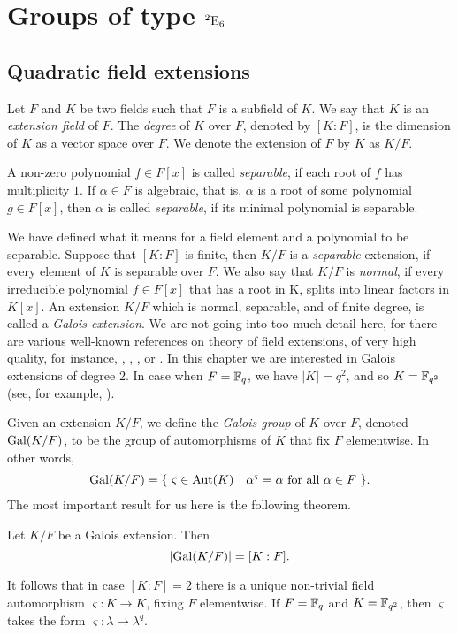 \chapter{Groups of type ${}^2\mathord{\mathrm{E}}_6$}
\ifpdf
    \graphicspath{{Chapter3/Chapter3Figs/PNG/}{Chapter3/Chapter3Figs/PDF/}{Chapter3/Chapter3Figs/}}
\else
    \graphicspath{{Chapter3/Chapter3Figs/EPS/}{Chapter3/Chapter3Figs/}}
\fi

\section{Quadratic field extensions}

Let $F$ and $K$ be two fields such that $F$ is a subfield of $K$. We say that 
$K$ is an \textit{extension field} of $F$. The \textit{degree} of $K$ over $F$, 
denoted by $[K:F]$, is the dimension of $K$ as a vector space over $F$. We denote the
extension of $F$ by $K$ as $K / F$.

A non-zero polynomial $f \in F[x]$ is called \textit{separable}, if each root of $f$ has 
multiplicity $1$. If $\alpha \in F$ is algebraic, that is, $\alpha$ is a root of some polynomial
$g \in F[x]$, then $\alpha$ is called \textit{separable}, if its minimal polynomial is separable. 

We have defined what it means for a field element and a polynomial to be separable. Suppose that
$[K:F]$ is finite, then $K / F$ is a \textit{separable} extension, if every element of $K$ is 
separable over $F$. We also say that $K / F$ is \textit{normal}, if every irreducible 
polynomial $f \in F[x]$ that has a root in K, splits into linear factors in $K[x]$. An extension
$K / F$ which is normal, separable, and of finite degree, is called a \textit{Galois extension}.
We are not going into too much detail here, for there are various  well-known references on theory
of field extensions, of very high quality, for instance, \cite{PeterCameron}, \cite{DummitFoote}, \cite{Lang}, or \cite{Stewart}. In this chapter
we are interested in Galois extensions of degree $2$. 
In case when $F = \mathbb{F}_q$, we have $|K| = q^2$, and so $K = \mathbb{F}_{q^2}$ (see, for example, \cite{Moore}).

Given an extension $K / F$, we define the \textit{Galois group} of $K$ over $F$, denoted
$\mathrm{Gal}(K / F)$, to be the group
of automorphisms of $K$ that fix $F$ elementwise. In other words,
\begin{equation}
	\Gal(K / F) = \{\ \varsigma \in \Aut(K)\ \big|\ \alpha^{\varsigma} = \alpha\ \mbox{for all}\ 
		\alpha \in F\ \}.
\end{equation}
The most important result for us here is the following theorem.
\begin{theorem}
	Let $K / F$ be a Galois extension. Then
	\begin{equation}
		| \mathrm{Gal}(K / F) | = [K : F].
	\end{equation}
\end{theorem}
It follows that in case $[K:F] = 2$ there is a unique non-trivial field automorphism 
$\varsigma : K \rightarrow K$, fixing $F$ elementwise. If $F = \mathbb{F}_q$ and $K = \mathbb{F}_{q^2}$, then
$\varsigma$ takes the form $\varsigma : \lambda \mapsto \lambda^q$. 

